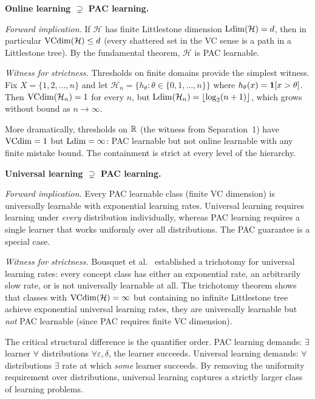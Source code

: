 \begin{separation}
\textbf{Online learning $\supsetneq$ PAC learning.}

\medskip\noindent
\emph{Forward implication.}
If $\mathcal{H}$ has finite Littlestone dimension $\mathrm{Ldim}(\mathcal{H})
= d$, then in particular $\mathrm{VCdim}(\mathcal{H}) \leq d$ (every shattered
set in the VC sense is a path in a Littlestone tree). By the fundamental
theorem, $\mathcal{H}$ is PAC learnable.

\medskip\noindent
\emph{Witness for strictness.}
Thresholds on finite domains provide the simplest witness. Fix
$X = \{1, 2, \ldots, n\}$ and let $\mathcal{H}_n = \{h_\theta :
\theta \in \{0, 1, \ldots, n\}\}$ where $h_\theta(x) = \mathbf{1}[x >
\theta]$. Then $\mathrm{VCdim}(\mathcal{H}_n) = 1$ for every $n$, but
$\mathrm{Ldim}(\mathcal{H}_n) = \lfloor \log_2(n+1) \rfloor$, which grows
without bound as $n \to \infty$.

More dramatically, thresholds on $\mathbb{R}$ (the witness from Separation~1)
have $\mathrm{VCdim} = 1$ but $\mathrm{Ldim} = \infty$: PAC learnable but not online
learnable with any finite mistake bound. The containment is strict at
every level of the hierarchy.

\hfill\cite{Littlestone1988}
\end{separation}


\begin{separation}
\textbf{Universal learning $\supsetneq$ PAC learning.}

\medskip\noindent
\emph{Forward implication.}
Every PAC learnable class (finite VC dimension) is universally learnable
with exponential learning rates. Universal learning requires learning
under \emph{every} distribution individually, whereas PAC learning
requires a single learner that works uniformly over all distributions.
The PAC guarantee is a special case.

\medskip\noindent
\emph{Witness for strictness.}
Bousquet et al.~\cite{BousquetHannekeMoranVanHandelYehudayoff2021}
established a trichotomy for universal learning rates: every concept
class has either an exponential rate, an arbitrarily slow rate, or is
not universally learnable at all. The trichotomy theorem shows that
classes with $\mathrm{VCdim}(\mathcal{H}) = \infty$ but containing no infinite
Littlestone tree achieve exponential universal learning rates, they
are universally learnable but \emph{not} PAC learnable (since PAC
requires finite VC dimension).

The critical structural difference is the quantifier order.
PAC learning demands: $\exists$ learner $\forall$ distributions
$\forall \varepsilon, \delta$, the learner succeeds. Universal learning
demands: $\forall$ distributions $\exists$ rate at which \emph{some}
learner succeeds. By removing the uniformity requirement over
distributions, universal learning captures a strictly larger class
of learning problems.

\hfill\cite{BousquetHannekeMoranVanHandelYehudayoff2021}
\end{separation}


